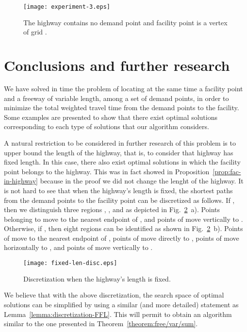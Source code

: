 \documentclass[11pt,a4paper,oneside,onecolumn]{article}
\begin{document}
\begin{figure}[h]
  \centering
  \texttt{[image: experiment-3.eps]}
  \caption{\small{The highway contains no demand point and facility point
  is a vertex of grid .}}
  \label{fig:experiment3}
\end{figure}

\section{Conclusions and further research}\label{section:conclu}

We have solved in  time the problem of locating at the same
time a facility point and a freeway of variable
length,
among a set of demand points, in order to minimize the total
weighted travel time from the demand points to the facility.
Some examples are presented to show that there exist optimal
solutions corresponding to each type of solutions that our
algorithm considers.

A natural restriction to be considered in further research
of this problem is to upper bound the length of the highway,
that is, to consider that highway has fixed length.
In this case, there also exist optimal solutions in which the facility
point belongs to the highway. This was in fact showed in
Proposition~\ref{prop:fac-in-highway} because in the proof
we did not change the lenght of the highway.
It is not hard to see that when the highway's length is fixed,
the shortest paths from the demand points to the facility point can be
discretized as follows. If , then we distinguish
three regions , , and  as depicted in
Fig.~\ref{fig:disc-fixed-len}~a). Points belonging to 
move to the nearest endpoint of ,
and points of  move vertically to . Otherwise,
if , then eight regions
 can be identified as 
shown in Fig.~\ref{fig:disc-fixed-len}~b). Points of
 move to the nearest endpoint of , 
points of  move directly to , points of 
move horizontally to , and points of  move vertically
to . 
\begin{figure}[h]
  \centering
  \texttt{[image: fixed-len-disc.eps]}
  \caption{\small{Discretization when the highway's length is fixed.}}
  \label{fig:disc-fixed-len}
\end{figure}

We believe that with the above discretization, the search space of
optimal solutions can be simplified by using a similar (and more detailed)
statement as Lemma~\ref{lemma:discretization-FFL}. This will permit
to obtain an algorithm similar to the one presented 
in Theorem~\ref{theorem:free/var/sum}.
\end{document}

